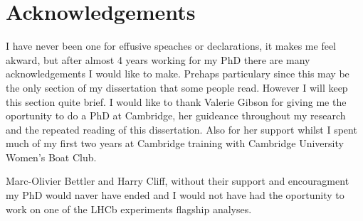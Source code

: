 




\chapter{Acknowledgements}

I have never been one for effusive speaches or declarations, it makes me feel akward, but after almost 4 years working for my PhD there are many acknowledgements I would like to make. Prehaps particulary since this may be the only section of my dissertation that some people read. However I will keep this section quite brief.
I would like to thank Valerie Gibson for giving me the oportunity to do a PhD at Cambridge, her guideance throughout my research and the repeated reading of this dissertation. Also for her support whilst I spent much of my first two years at Cambridge training with Cambridge University Women's Boat Club. 

Marc-Olivier Bettler and Harry Cliff, without their support and encouragment my PhD would naver have ended and I would not have had the oportunity to work on one of the LHCb experiments flagship analyses.


